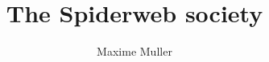 \documentclass[a4paper]{report}
\author{Maxime Muller}
\title{The Spiderweb society}
\begin{document}
\maketitle

\begin{abstract}

\end{abstract}

\newpage

\tableofcontents

\end{document}
